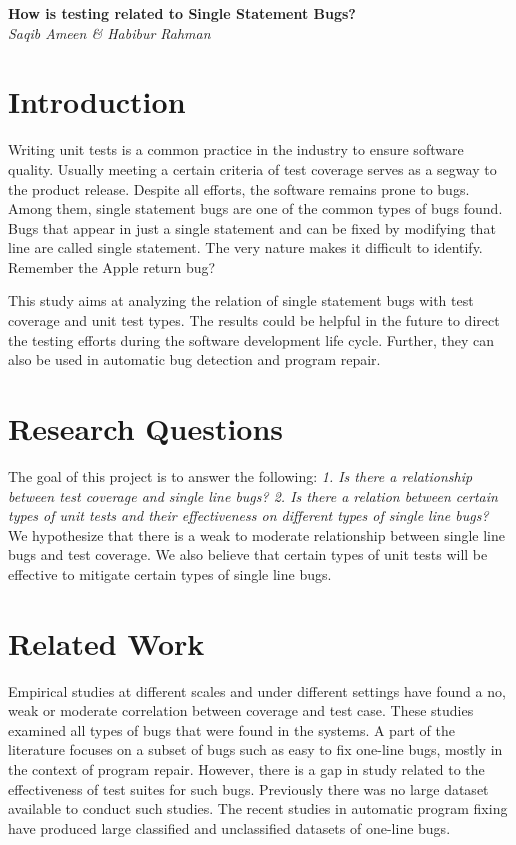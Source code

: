 \documentclass[11pt]{article}
\begin{document}
\begin{center}
{\bf \Large How is testing related to Single Statement Bugs?}\\
\vspace{.1in}
{\em Saqib Ameen \& Habibur Rahman}
\end{center}


\section{Introduction}

Writing unit tests is a common practice in the industry to ensure software quality. Usually meeting a certain criteria of test coverage serves as a segway to the product release. Despite all efforts, the software remains prone to bugs. Among them, single statement bugs are one of the common types of bugs found. Bugs that appear in just a single statement and can be fixed by modifying that line are called single statement. The very nature makes it difficult to identify. Remember the Apple return bug?

This study aims at analyzing the relation of single statement bugs with test coverage and unit test types. The results could be helpful in the future to direct the testing efforts during the software development life cycle. Further, they can also be used in automatic bug detection and program repair.

\section{Research Questions}

The goal of this project is to answer the following: \textit{1. Is there a relationship between test coverage and single line bugs? 2. Is there a relation between certain types of unit tests and their effectiveness on different types of single line bugs?} We hypothesize that there is a weak to moderate relationship between single line bugs and test coverage. We also believe that certain types of unit tests will be effective to mitigate certain types of single line bugs.

\section{Related Work}

Empirical studies \cite{gren2017relation, antinyan2018mythical, inozemtseva2014coverage} at different scales and under different settings have found a no, weak or moderate correlation between coverage and test case. These studies examined all types of bugs that were found in the systems. A part of the literature focuses on a subset of bugs such as easy to fix one-line bugs, mostly in the context of program repair. However, there is a gap in study related to the effectiveness of test suites for such bugs. Previously there was no large dataset available to conduct such studies. The recent studies in automatic program fixing have produced large classified \cite{karampatsis2020often} and unclassified \cite{chen2019sequencer} datasets of one-line bugs.
\end{document}
